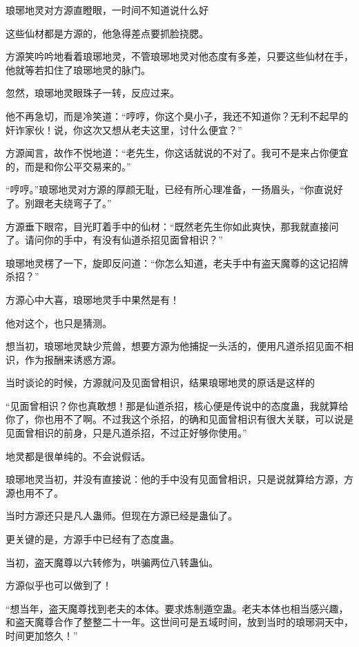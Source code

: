 
\begin{this_body}



琅琊地灵对方源直瞪眼，一时间不知道说什么好

这些仙材都是方源的，他急得差点要抓脸挠腮。

方源笑吟吟地看着琅琊地灵，不管琅琊地灵对他态度有多差，只要这些仙材在手，他就等若扣住了琅琊地灵的脉门。

忽然，琅琊地灵眼珠子一转，反应过来。

他不再急切，而是冷笑道：“哼哼，你这个臭小子，我还不知道你？无利不起早的奸诈家伙！说，你这次又想从老夫这里，讨什么便宜？”

方源闻言，故作不悦地道：“老先生，你这话就说的不对了。我可不是来占你便宜的，而是和你公平交易来的。”

“哼哼。”琅琊地灵对方源的厚颜无耻，已经有所心理准备，一扬眉头，“你直说好了。别跟老夫绕弯子了。”

方源垂下眼帘，目光盯着手中的仙材：“既然老先生你如此爽快，那我就直接问了。请问你的手中，有没有仙道杀招见面曾相识？”

琅琊地灵楞了一下，旋即反问道：“你怎么知道，老夫手中有盗天魔尊的这记招牌杀招？”

方源心中大喜，琅琊地灵手中果然是有！

他对这个，也只是猜测。

想当初，琅琊地灵缺少荒兽，想要方源为他捕捉一头活的，便用凡道杀招见面不相识，作为报酬来诱惑方源。

当时谈论的时候，方源就问及见面曾相识，结果琅琊地灵的原话是这样的

“见面曾相识？你也真敢想！那是仙道杀招，核心便是传说中的态度蛊，我就算给你了，你也用不了啊。不过我这个杀招，的确和见面曾相识有很大关联，可以说是见面曾相识的前身，只是凡道杀招，不过正好够你使用。”

地灵都是很单纯的。不会说假话。

琅琊地灵当初，并没有直接说：他的手中没有见面曾相识，只是说就算给方源，方源也用不了。

当时方源还只是凡人蛊师。但现在方源已经是蛊仙了。

更关键的是，方源手中已经有了态度蛊。

当初，盗天魔尊以六转修为，哄骗两位八转蛊仙。

方源似乎也可以做到了！

“想当年，盗天魔尊找到老夫的本体。要求炼制遁空蛊。老夫本体也相当感兴趣，和盗天魔尊合作了整整二十一年。这世间可是五域时间，放到当时的琅琊洞天中，时间更加悠久！”


\end{this_body}
